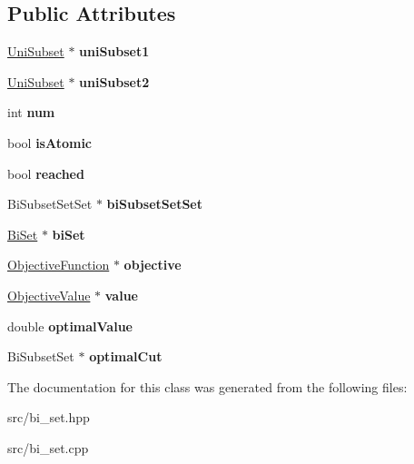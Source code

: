 \subsection*{Public Attributes}
\begin{DoxyCompactItemize}
\item 
\hypertarget{classBiSubset_a77f74c22c4aa92f91bd78308b2226722}{\hyperlink{classUniSubset}{Uni\-Subset} $\ast$ {\bfseries uni\-Subset1}}\label{classBiSubset_a77f74c22c4aa92f91bd78308b2226722}

\item 
\hypertarget{classBiSubset_ac457d4d17b160513bdbb0ebd0e953e98}{\hyperlink{classUniSubset}{Uni\-Subset} $\ast$ {\bfseries uni\-Subset2}}\label{classBiSubset_ac457d4d17b160513bdbb0ebd0e953e98}

\item 
\hypertarget{classBiSubset_a2c5e87f3e494ab45378f4a164067b593}{int {\bfseries num}}\label{classBiSubset_a2c5e87f3e494ab45378f4a164067b593}

\item 
\hypertarget{classBiSubset_ab99e33ac14000f58d9857ed350b22945}{bool {\bfseries is\-Atomic}}\label{classBiSubset_ab99e33ac14000f58d9857ed350b22945}

\item 
\hypertarget{classBiSubset_a62f9d6c80da8a1c1042cf7fc62c2fd74}{bool {\bfseries reached}}\label{classBiSubset_a62f9d6c80da8a1c1042cf7fc62c2fd74}

\item 
\hypertarget{classBiSubset_ae7762449606cb0881912516b860c02af}{Bi\-Subset\-Set\-Set $\ast$ {\bfseries bi\-Subset\-Set\-Set}}\label{classBiSubset_ae7762449606cb0881912516b860c02af}

\item 
\hypertarget{classBiSubset_a1032827bad10a9ecca017392a748b7fa}{\hyperlink{classBiSet}{Bi\-Set} $\ast$ {\bfseries bi\-Set}}\label{classBiSubset_a1032827bad10a9ecca017392a748b7fa}

\item 
\hypertarget{classBiSubset_a7ef49d4b3b6d7af08a01602a0edf34b8}{\hyperlink{classObjectiveFunction}{Objective\-Function} $\ast$ {\bfseries objective}}\label{classBiSubset_a7ef49d4b3b6d7af08a01602a0edf34b8}

\item 
\hypertarget{classBiSubset_a9db1dc5225f9f61d579dbef600d567b8}{\hyperlink{classObjectiveValue}{Objective\-Value} $\ast$ {\bfseries value}}\label{classBiSubset_a9db1dc5225f9f61d579dbef600d567b8}

\item 
\hypertarget{classBiSubset_adf8bd52488fe0c1aae0b6c32a6dac812}{double {\bfseries optimal\-Value}}\label{classBiSubset_adf8bd52488fe0c1aae0b6c32a6dac812}

\item 
\hypertarget{classBiSubset_a0cd31189cc46810f4c753ab12ebb4d47}{Bi\-Subset\-Set $\ast$ {\bfseries optimal\-Cut}}\label{classBiSubset_a0cd31189cc46810f4c753ab12ebb4d47}

\end{DoxyCompactItemize}


The documentation for this class was generated from the following files\-:\begin{DoxyCompactItemize}
\item 
src/bi\-\_\-set.\-hpp\item 
src/bi\-\_\-set.\-cpp\end{DoxyCompactItemize}
